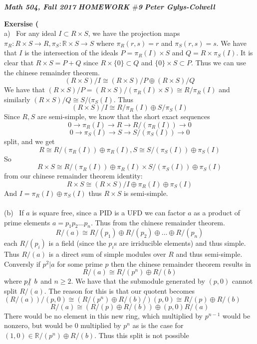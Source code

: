 \documentclass[12pt]{article}
\newenvironment{ques}[1]{\textbf{Exersise #1}\vspace{1 mm}\\ }{\bigskip}
\theoremstyle{definition}
\newcommand{\R}{\mathbb R}
\newcommand{\ndiv}{\hspace{-4pt}\not|\hspace{2pt}}
\begin{document}
\noindent \textit{\textbf{Math 504, Fall 2017}} \hspace{1.3cm}
\textit{\textbf{HOMEWORK $\#$9}} \hspace{1.3cm} \textit{\textbf{Peter
Gylys-Colwell}} 

\vspace{1cm}

\begin{ques}{9.1}
	(a) \ For any ideal $I \subset R \times S$, we have the projection maps
	$\pi_R:R\times S \to R, \pi_S: \R \times S \to S$ where $\pi_R(r,s) = r$
	and $\pi_S(r,s) = s$. We have that $I$ is the intersection of the ideals $P
	= \pi_R(I) \times S$ and $Q = R \times \pi_S(I)$. It is clear that $R
	\times S = P + Q$ since $R \times \{0\} \subset Q$ and $\{0\} \times S
	\subset P$. Thus we can use the chinese remainder theorem.
	$$(R \times S)/I \cong (R \times S) / P \oplus (R \times S)/ Q$$
	We have that $(R \times S)/ P = (R \times S) / (\pi_R(I) \times S) \cong R
	/ \pi_R(I)$ and similarly $(R \times S)/Q \cong S/(\pi_S(I)$. Thus
	$$(R \times S)/I \cong R/\pi_R(I) \oplus S/\pi_S(I)$$
	Since $R, S$ are semi-simple, we know that the short exact sequences
	$$0 \to \pi_R(I) \to R \to R/(\pi_R(I)) \to 0$$
	$$0 \to \pi_S(I) \to S \to S/(\pi_S(I)) \to 0$$
	split, and we get
	$$R \cong R/(\pi_R(I)) \oplus \pi_R(I), S \cong  S/(\pi_S(I)) \oplus \pi_S(I)$$
	So
	$$R \times S \cong R/(\pi_R(I)) \oplus \pi_R(I) \times S/(\pi_S(I)) \oplus
	\pi_S(I)$$
	from our chinese remainder theorem identity:
	$$R \times S \cong (R \times S)/I \oplus \pi_R(I) \oplus \pi_S(I)$$
	And $I =  \pi_R(I) \oplus \pi_S(I)$ thus $R \times
	S$ is semi-simple.\\
	\\
	(b) \ If $a$ is square free, since a PID is a UFD we can factor $a$ as a
	product of prime elements $a = p_1p_2 \dots p_n$. Thus from the chinese
	remainder theorem.
	$$R/(a) \cong R/(p_1) \oplus R/(p_2) \oplus \dots \oplus R/(p_n)$$
	each $R/(p_i)$ is a field (since the $p_i$s are irriducible elements) and
	thus simple. Thus $R/(a)$ is a direct sum of simple modules over $R$ and
	thus semi-simple.\\
	Conversly if $p^2 | a$ for some prime $p$ then the chinese remainder
	theorem results in
	$$R/(a) \cong R/(p^n) \oplus R/(b)$$
	where $p \ndiv \ b$ and $n \geq 2$. We have that the submodule generated by
	$(p,0)$ cannot split $R/(a)$. The reason for this is that our quotent
	becomes $(R/(a))/(p,0) \cong (R/(p^n) \oplus R/(b)/)(p,0) \cong R/(p) \oplus R/(b)$
	$$R/(a) \cong (R/(p) \oplus R/(b)) \oplus (p,0)R/(a)$$
	There would be no element in this new ring, which multiplied by $p^{n-1}$
	would be nonzero, but would be $0$ multiplied by $p^n$ as is the case for
	$(1,0) \in \R/(p^n) \oplus R/(b)$. Thus this split is not possible
\end{ques}
\end{document}
